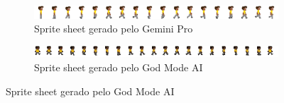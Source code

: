 \begin{figure}[htbp]
\begin{subfigure}{1\linewidth}
        \centering
        \includegraphics[width=1\linewidth]{figs/geminiPro/walking_sprite_sheet_grande_pixel.png}
        \caption{\small Sprite sheet gerado pelo Gemini Pro}
        \label{fig:pixelLabSpriteSheetGeminiPro}
    \end{subfigure}
    \begin{subfigure}{1\linewidth}
        \centering
        \includegraphics[width=1\linewidth]{figs/godmodAI/Pixilart/pixilart-sprite.png}
        \caption{\small Sprite sheet gerado pelo God Mode AI}
        \label{fig:pixelLabSpriteSheetGodModeAI}
    \end{subfigure}
\end{figure}

